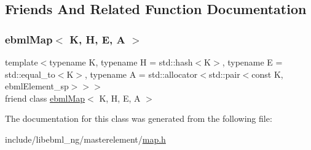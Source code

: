 \subsection{Friends And Related Function Documentation}
\mbox{\label{classebml_1_1ebmlMapClass_a691e480013452ea48661a61746fd1b5c}} 
\subsubsection{\texorpdfstring{ebml\+Map$<$ K, H, E, A $>$}{ebmlMap< K, H, E, A >}}
{\footnotesize\ttfamily template$<$typename K, typename H = std\+::hash$<$\+K$>$, typename E = std\+::equal\+\_\+to$<$\+K$>$, typename A = std\+::allocator$<$std\+::pair$<$const K, ebml\+Element\+\_\+sp$>$$>$$>$ \\
friend class \mbox{\hyperlink{classebml_1_1ebmlMap}{ebml\+Map}}$<$ K, H, E, A $>$\hspace{0.3cm}{\ttfamily [friend]}}



The documentation for this class was generated from the following file\+:\begin{DoxyCompactItemize}
\item 
include/libebml\+\_\+ng/masterelement/\mbox{\hyperlink{map_8h}{map.\+h}}\end{DoxyCompactItemize}
